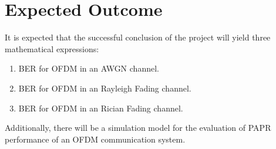 \section{Expected Outcome}
It is expected that the successful conclusion of the project will yield three mathematical expressions:
\begin{enumerate}
	\item \gls{BER} for \gls{OFDM} in an \gls{AWGN} channel.
	\item \gls{BER} for \gls{OFDM} in an Rayleigh Fading channel.
	\item \gls{BER} for \gls{OFDM} in an Rician Fading channel.
\end{enumerate}

Additionally, there will be a simulation model for the evaluation of \gls{PAPR} performance of an \gls{OFDM} communication system.